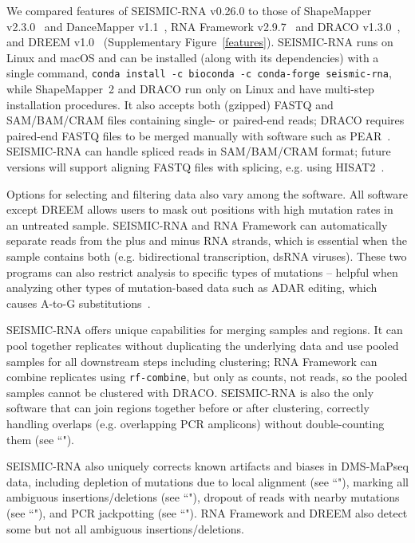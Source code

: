 \documentclass[unnumsec,webpdf,contemporary,large]{oup-authoring-template}%
\theoremstyle{thmstyleone}%
\theoremstyle{thmstyletwo}%
\theoremstyle{thmstylethree}%
\begin{document}
We compared features of SEISMIC-RNA v0.26.0 to those of ShapeMapper v2.3.0~\cite{Busan2018} and DanceMapper v1.1~\cite{Olson2022}, RNA Framework v2.9.7~\cite{Incarnato2018} and DRACO v1.3.0~\cite{Morandi2021}, and DREEM v1.0~\cite{Tomezsko2020} (Supplementary Figure~\ref{features}).
SEISMIC-RNA runs on Linux and \mbox{macOS} and can be installed (along with its dependencies) with a single command, \verb|conda install -c bioconda -c conda-forge seismic-rna|, while ShapeMapper~2 and DRACO run only on Linux and have multi-step installation procedures.
It also accepts both (gzipped) FASTQ and SAM/BAM/CRAM files containing single- or paired-end reads; DRACO requires paired-end FASTQ files to be merged manually with software such as PEAR~\cite{Zhang2013}.
SEISMIC-RNA can handle spliced reads in SAM/BAM/CRAM format; future versions will support aligning FASTQ files with splicing, e.g. using HISAT2~\cite{Kim2019}.

Options for selecting and filtering data also vary among the software.
All software except DREEM allows users to mask out positions with high mutation rates in an untreated sample.
SEISMIC-RNA and RNA Framework can automatically separate reads from the plus and minus RNA strands, which is essential when the sample contains both (e.g. bidirectional transcription, dsRNA viruses).
These two programs can also restrict analysis to specific types of mutations -- helpful when analyzing other types of mutation-based data such as ADAR editing, which causes A-to-G substitutions~\cite{Okada2019,Shin2026}.

SEISMIC-RNA offers unique capabilities for merging samples and regions.
It can pool together replicates without duplicating the underlying data and use pooled samples for all downstream steps including clustering; RNA Framework can combine replicates using \verb|rf-combine|, but only as counts, not reads, so the pooled samples cannot be clustered with DRACO.
SEISMIC-RNA is also the only software that can join regions together before or after clustering, correctly handling overlaps (e.g. overlapping PCR amplicons) without double-counting them (see ``").

SEISMIC-RNA also uniquely corrects known artifacts and biases in DMS-MaPseq data, including depletion of mutations due to local alignment (see ``"), marking all ambiguous insertions/deletions (see ``"), dropout of reads with nearby mutations (see ``"), and PCR jackpotting (see ``").
RNA Framework and DREEM also detect some but not all ambiguous insertions/deletions.
\end{document}
